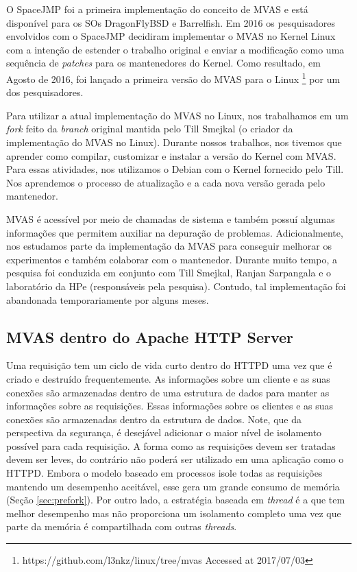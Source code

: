 O SpaceJMP \citep{spacejmp} foi a primeira implementação do conceito de MVAS e
está disponível para os SOs DragonFlyBSD e Barrelfish. Em 2016 os pesquisadores
envolvidos com o SpaceJMP decidiram implementar o MVAS no Kernel Linux com a
intenção de estender o trabalho original e enviar a modificação como uma
sequência de \emph{patches} para os mantenedores do Kernel. Como resultado, em
Agosto de 2016, foi lançado a primeira versão do MVAS para o Linux
\footnote{https://github.com/l3nkz/linux/tree/mvas Accessed at 2017/07/03} por
um dos pesquisadores.
 
Para utilizar a atual implementação do MVAS no Linux, nos trabalhamos em um
\emph{fork} feito da \emph{branch} original mantida pelo Till Smejkal (o
criador da implementação do MVAS no Linux). Durante nossos trabalhos, nos
tivemos que aprender como compilar, customizar e instalar a versão do Kernel
com MVAS. Para essas atividades, nos utilizamos o Debian com o Kernel fornecido
pelo Till. Nos aprendemos o processo de atualização e a cada nova versão gerada
pelo mantenedor.

MVAS é acessível por meio de chamadas de sistema e também possuí algumas
informações que permitem auxiliar na depuração de problemas. Adicionalmente,
nos estudamos parte da implementação da MVAS para conseguir melhorar os
experimentos e também colaborar com o mantenedor. Durante muito tempo, a
pesquisa foi conduzida em conjunto com Till Smejkal, Ranjan Sarpangala e o
laboratório da HPe (responsáveis pela pesquisa). Contudo, tal implementação foi
abandonada temporariamente por alguns meses.
 
\subsection{MVAS dentro do Apache HTTP Server}

Uma requisição tem um ciclo de vida curto dentro do HTTPD uma vez que é criado
e destruído frequentemente. As informações sobre um cliente e as suas conexões
são armazenadas dentro de uma estrutura de dados para manter as informações
sobre as requisições. Essas informações sobre os clientes e as suas conexões
são armazenadas dentro da estrutura de dados. Note, que da perspectiva da
segurança, é desejável adicionar o maior nível de isolamento possível para cada
requisição. A forma como as requisições devem ser tratadas devem ser leves, do
contrário não poderá ser utilizado em uma aplicação como o HTTPD. Embora o
modelo baseado em processos isole todas as requisições mantendo um desempenho
aceitável, esse gera um grande consumo de memória (Seção \ref{sec:prefork}).
Por outro lado, a estratégia baseada em \emph{thread} é a que tem melhor
desempenho mas não proporciona um isolamento completo uma vez que parte da
memória é compartilhada com outras \emph{threads}.

